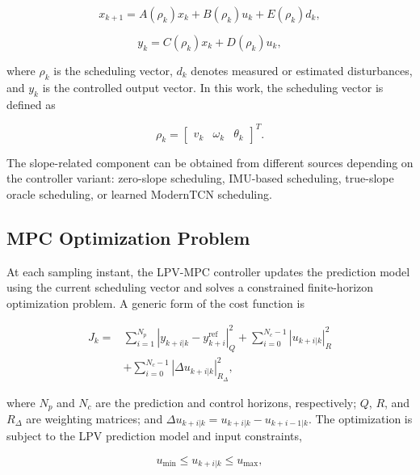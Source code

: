 \documentclass[twocolumn]{article}
\begin{document}
\begin{equation}
x_{k+1} =
A(\rho_k)x_k + B(\rho_k)u_k + E(\rho_k)d_k,
\label{eq:lpv_state}
\end{equation}

\begin{equation}
y_k = C(\rho_k)x_k + D(\rho_k)u_k,
\label{eq:lpv_output}
\end{equation}

where $\rho_k$ is the scheduling vector, $d_k$ denotes measured or estimated disturbances, and $y_k$ is the controlled output vector. In this work, the scheduling vector is defined as

\begin{equation}
\rho_k =
\begin{bmatrix}
v_k & \omega_k & \theta_k
\end{bmatrix}^{T}.
\label{eq:scheduling_vector}
\end{equation}

The slope-related component can be obtained from different sources depending on the controller variant: zero-slope scheduling, IMU-based scheduling, true-slope oracle scheduling, or learned ModernTCN scheduling.

\subsection{MPC Optimization Problem}

At each sampling instant, the LPV-MPC controller updates the prediction model using the current scheduling vector and solves a constrained finite-horizon optimization problem. A generic form of the cost function is

\begin{equation}
\begin{aligned}
J_k =
& \sum_{i=1}^{N_p}
\left|
y_{k+i|k} - y^{\mathrm{ref}}_{k+i}
\right|_{Q}^{2}
+
\sum_{i=0}^{N_c-1}
\left|
u_{k+i|k}
\right|_{R}^{2} \\
& +
\sum_{i=0}^{N_c-1}
\left|
\Delta u_{k+i|k}
\right|_{R_{\Delta}}^{2},
\end{aligned}
\label{eq:mpc_cost}
\end{equation}

where $N_p$ and $N_c$ are the prediction and control horizons, respectively; $Q$, $R$, and $R_{\Delta}$ are weighting matrices; and $\Delta u_{k+i|k}=u_{k+i|k}-u_{k+i-1|k}$. The optimization is subject to the LPV prediction model and input constraints,

\begin{equation}
u_{\min} \leq u_{k+i|k} \leq u_{\max},
\label{eq:input_constraint}
\end{equation}
\end{document}
